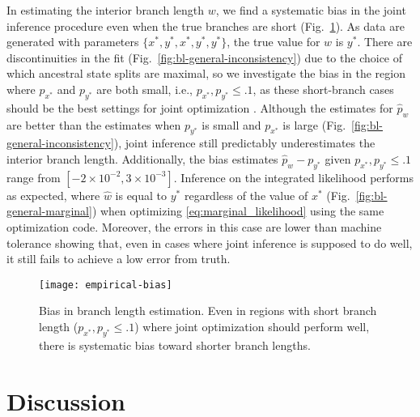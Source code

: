 \documentclass[11pt]{article}
\begin{document}
In estimating the interior branch length $w$, we find a systematic bias in the joint inference procedure even when the true branches are short (Fig.~\ref{fig:empirical-bias}).
As data are generated with parameters $\{x^*, y^*, x^*, y^*, y^*\}$, the true value for $w$ is $y^*$.
There are discontinuities in the fit (Fig.~\ref{fig:bl-general-inconsistency}) due to the choice of which ancestral state splits are maximal, so we investigate the bias in the region where $p_{x^*}$ and $p_{y^*}$ are both small, i.e., $p_{x^*}, p_{y^*} \le .1$, as these short-branch cases should be the best settings for joint optimization \citep{Sagulenko2018-xl}.
Although the estimates for $\hat{p}_w$ are better than the estimates when $p_{y^*}$ is small and $p_{x^*}$ is large (Fig.~\ref{fig:bl-general-inconsistency}), joint inference still predictably underestimates the interior branch length.
Additionally, the bias estimates $\hat{p}_w-p_{y^*}$ given $p_{x^*}, p_{y^*} \le .1$ range from $[-2\times 10^{-2}, 3\times 10^{-3}]$.
Inference on the integrated likelihood performs as expected, where $\hat{w}$ is equal to $y^*$ regardless of the value of $x^*$ (Fig.~\ref{fig:bl-general-marginal}) when optimizing \eqref{eq:marginal_likelihood} using the same optimization code.
Moreover, the errors in this case are lower than machine tolerance showing that, even in cases where joint inference is supposed to do well, it still fails to achieve a low error from truth.


\begin{figure}
\centering
\texttt{[image: empirical-bias]}
\caption{
Bias in branch length estimation.
Even in regions with short branch length ($p_{x^*}, p_{y^*} \le .1$) where joint optimization should perform well, there is systematic bias toward shorter branch lengths.
}
\label{fig:empirical-bias}
\end{figure}

\section*{Discussion}
\end{document}
